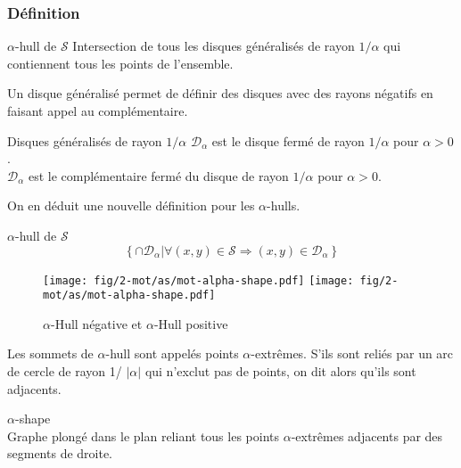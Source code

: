 \subsubsection{Définition}

\begin{Definition}{$\alpha$-hull de $\mathcal{S}$}
\label{def:ah-txt}
    Intersection de tous les disques généralisés de rayon $1/\alpha$ qui contiennent tous les points de l'ensemble.
\end{Definition}

Un disque généralisé permet de définir des disques avec des rayons négatifs en faisant appel au complémentaire.

\begin{Definition}{Disques généralisés de rayon $1/\alpha$}
\label{def:dis-gen}
   $\mathcal{D}_{\alpha}$ est le disque fermé de rayon $1/\alpha$ pour $\alpha > 0$.\\
   $\mathcal{D}_{\alpha}$ est le complémentaire fermé du disque de rayon $1/\alpha$ pour $\alpha > 0$.
\end{Definition}

On en déduit une nouvelle définition pour les $\alpha$-hulls.

\begin{Definition}{$\alpha$-hull de $\mathcal{S}$}
\label{def:ah}
    $$\left\{ \cap \mathcal{D}_{\alpha} | \forall (x,y)\in \mathcal{S} \Rightarrow (x,y) \in \mathcal{D}_{\alpha} \right\}$$
\end{Definition}

\begin{figure}[h!]
  \centering
  \texttt{[image: fig/2-mot/as/mot-alpha-shape.pdf]}
  \texttt{[image: fig/2-mot/as/mot-alpha-shape.pdf]}
  \caption{$\alpha$-Hull négative et $\alpha$-Hull positive }
\end{figure}
  

Les sommets de $\alpha$-hull sont appelés points $\alpha$-extrêmes. S'ils sont reliés par un arc de cercle de rayon 1/ $\lvert \alpha \rvert$ qui n'exclut pas de points, on dit alors qu'ils sont adjacents.

\begin{Definition}{$\alpha$-shape}\\
\label{def:as}
      Graphe plongé dans le plan reliant tous les points $\alpha$-extrêmes adjacents par des segments de droite.
\end{Definition}

